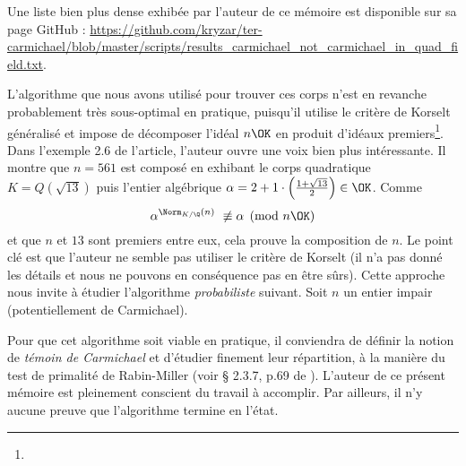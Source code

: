 \begin{Complement}
	Une liste bien plus dense exhibée par l'auteur de ce mémoire est disponible sur sa page GitHub : \url{https://github.com/kryzar/ter-carmichael/blob/master/scripts/results_carmichael_not_carmichael_in_quad_field.txt}. \\
\end{Complement}

L'algorithme que nous avons utilisé pour trouver ces corps n'est en revanche probablement très sous-optimal en pratique, puisqu'il utilise le critère de Korselt généralisé et impose de décomposer l'idéal $n\OK$ en produit d'idéaux premiers\footnote{}. Dans l'exemple 2.6 de l'article, l'auteur ouvre une voix bien plus intéressante. Il montre que $n = 561$ est composé en exhibant le corps quadratique $K = Q(\sqrt{13})$ puis l'entier algébrique $\alpha = 2 + 1\cdot \left(\frac{1 + \sqrt{13}}{2}\right) \in \OK$. Comme $$\alpha^{\Norm_{K/\Q}(n)} \not \equiv \alpha \pmod{n\OK}$$ et que $n$ et $13$ sont premiers entre eux, cela prouve la composition de $n$. Le point clé est que l'auteur ne semble pas utiliser le critère de Korselt (il n'a pas donné les détails et nous ne pouvons en conséquence pas en être sûrs). Cette approche nous invite à étudier l'algorithme \emph{probabiliste} suivant. Soit $n$ un entier impair (potentiellement de Carmichael).

\vspace{1em}
\begin{algorithm}[H]\label{algo-quadratique-faible}
\end{algorithm}
\vspace{1em}

Pour que cet algorithme soit viable en pratique, il conviendra de définir la notion de \textit{témoin de Carmichael} et d'étudier finement leur répartition, à la manière du test de primalité de Rabin-Miller (voir § 2.3.7, p.69 de \cite{Demazure}). L'auteur de ce présent mémoire est pleinement conscient du travail à accomplir. Par ailleurs, il n'y aucune preuve que l'algorithme termine en l'état. \\

